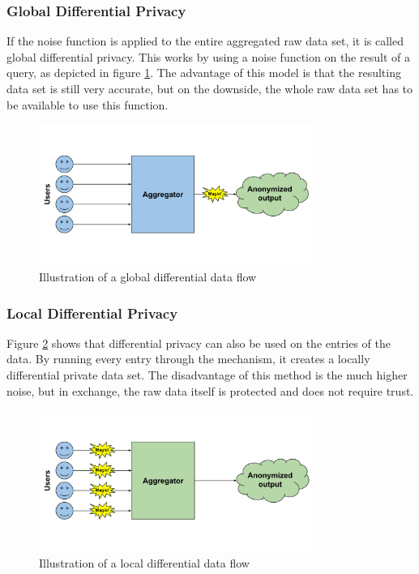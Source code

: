 \subsubsection{Global Differential Privacy}

If the noise function is applied to the entire aggregated raw data set, it is called global differential privacy. This works by using a noise function on the result of a query, as depicted in figure \ref{fig:global_diff}. The advantage of this model is that the resulting data set is still very accurate, but on the downside, the whole raw data set has to be available to use this function.

\begin{figure}[htpb]
  \centering
  \includegraphics[width=0.8\textwidth]{figures/global_diff.png}
  \caption{Illustration of a global differential data flow} \label{fig:global_diff}
\end{figure}

\subsubsection{Local Differential Privacy}
Figure \ref{fig:local_diff} shows that differential privacy can also be used on the entries of the data. By running every entry through the mechanism, it creates a locally differential private data set. The disadvantage of this method is the much higher noise, but in exchange, the raw data itself is protected and does not require trust.

\begin{figure}[htpb]
  \centering
  \includegraphics[width=0.8\textwidth]{figures/local_diff.png}
  \caption{Illustration of a local differential data flow} \label{fig:local_diff}
\end{figure}

